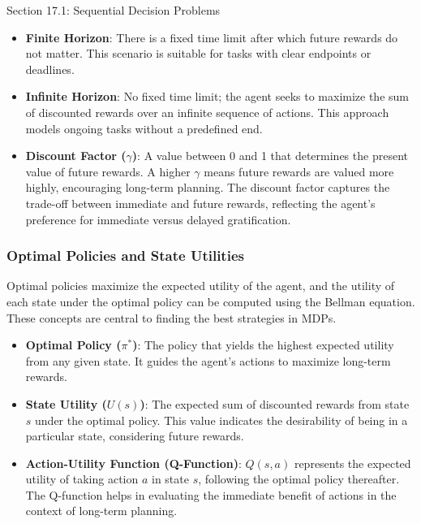 \begin{notes}{Section 17.1: Sequential Decision Problems}
\begin{highlight}
        \begin{itemize}
            \item \textbf{Finite Horizon}: There is a fixed time limit after which future rewards do not matter. This scenario is suitable for tasks with clear endpoints or deadlines.
            \item \textbf{Infinite Horizon}: No fixed time limit; the agent seeks to maximize the sum of discounted rewards over an infinite sequence of actions. This approach models ongoing tasks without a predefined end.
            \item \textbf{Discount Factor (\(\gamma\))}: A value between 0 and 1 that determines the present value of future rewards. A higher \(\gamma\) means future rewards are valued more highly, 
            encouraging long-term planning. The discount factor captures the trade-off between immediate and future rewards, reflecting the agent's preference for immediate versus delayed gratification.
        \end{itemize}
    
    \end{highlight}
    
    \subsubsection*{Optimal Policies and State Utilities}
    
    Optimal policies maximize the expected utility of the agent, and the utility of each state under the optimal policy can be computed using the Bellman equation. These concepts are central to 
    finding the best strategies in MDPs.
    
    \begin{highlight}
    
        \begin{itemize}
            \item \textbf{Optimal Policy (\(\pi^*\))}: The policy that yields the highest expected utility from any given state. It guides the agent's actions to maximize long-term rewards.
            \item \textbf{State Utility (\(U(s)\))}: The expected sum of discounted rewards from state \(s\) under the optimal policy. This value indicates the desirability of being in a particular state, 
            considering future rewards.
            \item \textbf{Action-Utility Function (Q-Function)}: \(Q(s, a)\) represents the expected utility of taking action \(a\) in state \(s\), following the optimal policy thereafter. The Q-function 
            helps in evaluating the immediate benefit of actions in the context of long-term planning.
        \end{itemize}
    

\end{highlight}
\end{notes}
